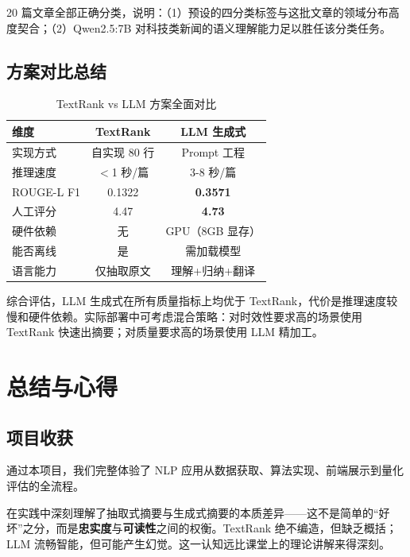 \documentclass[12pt,a4paper]{ctexart}
\begin{document}
20 篇文章全部正确分类，说明：（1）预设的四分类标签与这批文章的领域分布高度契合；（2）Qwen2.5:7B 对科技类新闻的语义理解能力足以胜任该分类任务。

\subsection{方案对比总结}

\begin{table}[H]
\centering
\caption{TextRank vs LLM 方案全面对比}
\label{tab:comparison}
\small
\begin{tabular}{lcc}
\toprule
\textbf{维度} & \textbf{TextRank} & \textbf{LLM 生成式} \\
\midrule
实现方式   & 自实现 80 行 & Prompt 工程 \\
推理速度   & $<$1 秒/篇  & 3-8 秒/篇 \\
ROUGE-L F1 & 0.1322      & \textbf{0.3571} \\
人工评分   & 4.47        & \textbf{4.73} \\
硬件依赖   & 无          & GPU（8GB 显存） \\
能否离线   & 是          & 需加载模型 \\
语言能力   & 仅抽取原文  & 理解+归纳+翻译 \\
\bottomrule
\end{tabular}
\end{table}

综合评估，LLM 生成式在所有质量指标上均优于 TextRank，代价是推理速度较慢和硬件依赖。实际部署中可考虑混合策略：对时效性要求高的场景使用 TextRank 快速出摘要；对质量要求高的场景使用 LLM 精加工。

\section{总结与心得}

\subsection{项目收获}

通过本项目，我们完整体验了 NLP 应用从数据获取、算法实现、前端展示到量化评估的全流程。

在实践中深刻理解了抽取式摘要与生成式摘要的本质差异——这不是简单的“好坏”之分，而是\textbf{忠实度}与\textbf{可读性}之间的权衡。TextRank 绝不编造，但缺乏概括；LLM 流畅智能，但可能产生幻觉。这一认知远比课堂上的理论讲解来得深刻。
\end{document}
